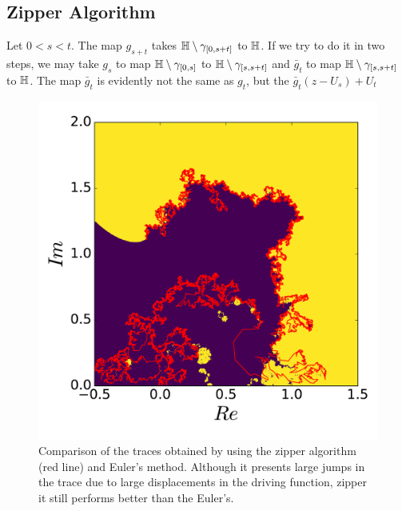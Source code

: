 \subsection{Zipper Algorithm}
\label{ss:zipper}

Let $0<s<t$. The map $g_{s+t}$ takes $\mathbb{H}\setminus\gamma_{[0,s+t]}$ to $\mathbb{H}$.
If we try to do it in two steps, we may take $g_s$ to map 
$\mathbb{H}\setminus\gamma_{[0,s]}$ to $\mathbb{H}\setminus\gamma_{[s, s+t]}$ and 
$\bar{g}_{t}$ to map $\mathbb{H}\setminus\gamma_{[s, s+t]}$ to $\mathbb{H}$. The
map $\bar{g}_t$ is evidently not the same as $g_t$, but the 
$\bar{g}_t(z-U_s)+U_t$ 

\begin{figure}
\begin{center}
    \includegraphics[scale=0.5]{chapters/ch4-sle/figs/eulerzip}
\end{center}
\caption{Comparison of the traces obtained by using the zipper algorithm (red
    line) and Euler's method. Although it presents large jumps in the trace due
    to large displacements in the driving function, zipper it still performs
    better than the Euler's.}
\label{fig:euzip}
\end{figure}


